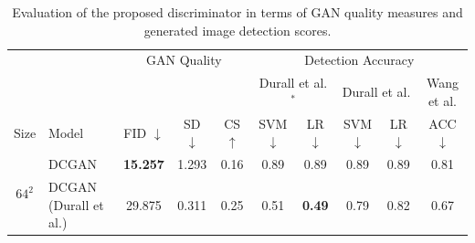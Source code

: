 \documentclass[letterpaper]{article} %
\begin{document}
\begin{table}
    \caption{Evaluation of the proposed discriminator in terms of GAN quality measures and generated image detection scores. %
    }
    \label{tab1}
    \small
    \centering
    \begin{tabular}{l|l|ccc|ccccc}
        \toprule
        &&\multicolumn{3}{c}{GAN Quality}&\multicolumn{5}{c}{Detection Accuracy}\\
         &&&&&\multicolumn{2}{c}{Durall et al.$^*$}
        &\multicolumn{2}{c}{Durall et al.}&Wang et al.\\
        Size & Model & FID $\downarrow$ & SD $\downarrow$ & CS $\uparrow$ & SVM $\downarrow$ & LR $\downarrow$ & SVM $\downarrow$ & LR $\downarrow$ & ACC $\downarrow$ \\
        \midrule
\multicolumn{1}{c|}{\multirow{9}{*}{$64^2$}} 
& DCGAN & {\bf 15.257} & 1.293 & 0.16& 0.89&0.89& 0.89&0.89  &0.81\\
& DCGAN (Durall et al.)& 29.875 & 0.311 & 0.25 & 0.51&{\bf 0.49}& 0.79&0.82&0.67 \\

\end{tabular}
\end{table}
\end{document}
